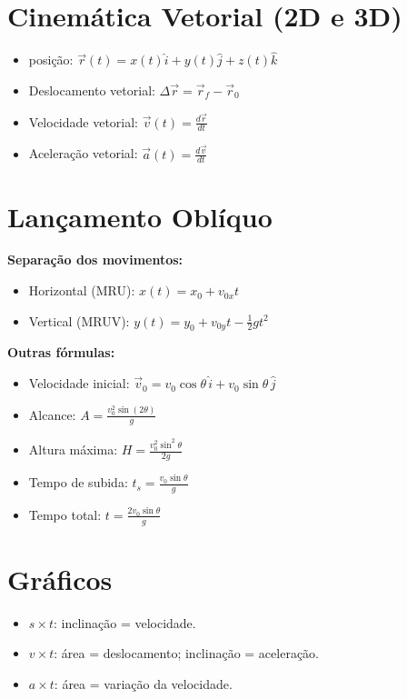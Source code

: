 \documentclass[a4paper,12pt]{article}
\begin{document}
\begin{multicols}{2}
\section{Cinemática Vetorial (2D e 3D)}
\begin{itemize}
  \item posição: $\vec{r}(t) = x(t)\hat{i} + y(t)\hat{j} + z(t)\hat{k}$
  \item Deslocamento vetorial: $\Delta \vec{r} = \vec{r}_f - \vec{r}_0$
  \item Velocidade vetorial: $\vec{v}(t) = \frac{d\vec{r}}{dt}$
  \item Aceleração vetorial: $\vec{a}(t) = \frac{d\vec{v}}{dt}$
\end{itemize}

\section{Lançamento Oblíquo}
\textbf{Separação dos movimentos:}
\begin{itemize}
  \item Horizontal (MRU): $x(t) = x_0 + v_{0x} t$
  \item Vertical (MRUV): $y(t) = y_0 + v_{0y} t - \frac{1}{2} g t^2$
\end{itemize}

\textbf{Outras fórmulas:}
\begin{itemize}
  \item Velocidade inicial: $\vec{v}_0 = v_0 \cos\theta\,\hat{i} + v_0 \sin\theta\,\hat{j}$
  \item Alcance: $A = \frac{v_0^2 \sin(2\theta)}{g}$
  \item Altura máxima: $H = \frac{v_0^2 \sin^2\theta}{2g}$
  \item Tempo de subida: $t_s = \frac{v_0 \sin\theta}{g}$
  \item Tempo total: $t = \frac{2 v_0 \sin\theta}{g}$
\end{itemize}

\section{Gráficos}
\begin{itemize}
  \item $s \times t$: inclinação = velocidade.
  \item $v \times t$: área = deslocamento; inclinação = aceleração.
  \item $a \times t$: área = variação da velocidade.
\end{itemize}


\end{multicols}
\end{document}
